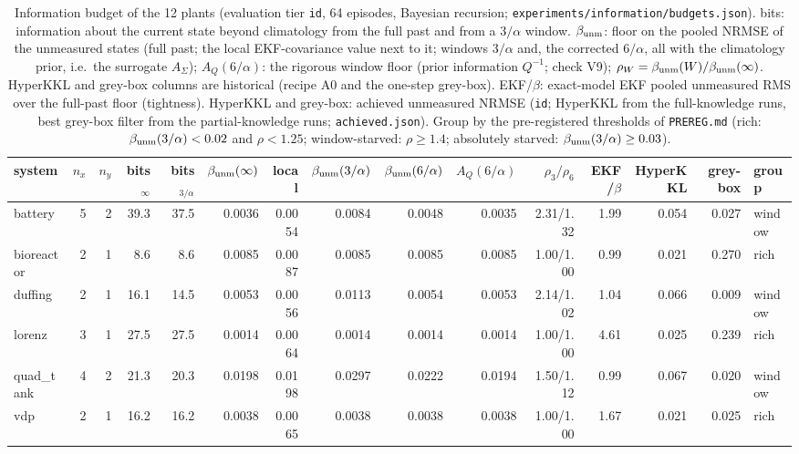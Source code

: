 \begin{table}[ht]\centering\scriptsize
\caption{Information budget of the 12 plants (evaluation tier \texttt{id}, 64 episodes, Bayesian recursion;
\texttt{experiments/information/budgets.json}). bits: information about the current state beyond climatology
from the full past and from a $3/\alpha$ window. $\beta_{\rm unm}$: floor on the pooled NRMSE of the
unmeasured states (full past; the local EKF-covariance value next to it; windows $3/\alpha$ and,  the corrected $6/\alpha$, all with the climatology prior, i.e.\ the surrogate $A_\Sigma$);
$A_Q(6/\alpha)$: the rigorous window floor (prior information $Q^{-1}$; check V9);
$\rho_W=\beta_{\rm unm}(W)/\beta_{\rm unm}(\infty)$. HyperKKL and grey-box columns are historical (recipe A0 and the one-step grey-box). EKF/$\beta$: exact-model EKF pooled unmeasured RMS over the
full-past floor (tightness). HyperKKL and grey-box: achieved unmeasured NRMSE (\texttt{id}; HyperKKL from the
full-knowledge runs, best grey-box filter from the partial-knowledge runs; \texttt{achieved.json}). Group by the
pre-registered thresholds of \texttt{PREREG.md} (rich: $\beta_{\rm unm}(3/\alpha)<0.02$ and $\rho<1.25$; window-starved:
$\rho\ge1.4$; absolutely starved: $\beta_{\rm unm}(3/\alpha)\ge0.03$).}\label{tab:m4-budgets}
\setlength{\tabcolsep}{1.5pt}
\begin{tabular}{@{}lrrrrrrrrrrrrrl@{}}\hline
system & $n_x$ & $n_y$ & bits$_\infty$ & bits$_{3/\alpha}$ & $\beta_{\rm unm}(\infty)$ & local & $\beta_{\rm unm}(3/\alpha)$ & $\beta_{\rm unm}(6/\alpha)$ & $A_Q(6/\alpha)$ & $\rho_3/\rho_6$ & EKF/$\beta$ & HyperKKL & grey-box & group\\\hline
battery & 5 & 2 & 39.3 & 37.5 & 0.0036 & 0.0054 & 0.0084 & 0.0048 & 0.0035 & 2.31/1.32 & 1.99 & 0.054 & 0.027 & window \\
bioreactor & 2 & 1 & 8.6 & 8.6 & 0.0085 & 0.0087 & 0.0085 & 0.0085 & 0.0085 & 1.00/1.00 & 0.99 & 0.021 & 0.270 & rich \\
duffing & 2 & 1 & 16.1 & 14.5 & 0.0053 & 0.0056 & 0.0113 & 0.0054 & 0.0053 & 2.14/1.02 & 1.04 & 0.066 & 0.009 & window \\
lorenz & 3 & 1 & 27.5 & 27.5 & 0.0014 & 0.0064 & 0.0014 & 0.0014 & 0.0014 & 1.00/1.00 & 4.61 & 0.025 & 0.239 & rich \\
quad\_tank & 4 & 2 & 21.3 & 20.3 & 0.0198 & 0.0198 & 0.0297 & 0.0222 & 0.0194 & 1.50/1.12 & 0.99 & 0.067 & 0.020 & window \\
vdp & 2 & 1 & 16.2 & 16.2 & 0.0038 & 0.0065 & 0.0038 & 0.0038 & 0.0038 & 1.00/1.00 & 1.67 & 0.021 & 0.025 & rich \\

\end{tabular}
\end{table}
